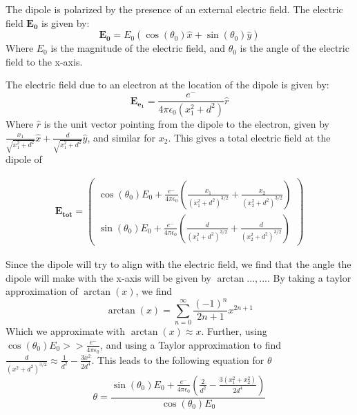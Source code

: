 The dipole is polarized by the presence of an external electric field. The electric field $\mathbf{E_0}$ is given by:
\begin{equation}
    \mathbf{E_0} = 
    E_0 (\cos(\theta_0) \hat{x} + \sin(\theta_0) \hat{y})
\end{equation}
Where $E_0$ is the magnitude of the electric field, and $\theta_0$ is the angle of the electric field to the x-axis. 

The electric field due to an electron at the location of the dipole is given by:
\begin{equation}
    \mathbf{E_{\text{e}_1}} = 
    \frac{e^-}{4 \pi \epsilon_0 (x_1^2+d^2)} \hat{r} 
\end{equation}
Where $\hat{r}$ is the unit vector pointing from the dipole to the electron, given by $\frac{x_1}{\sqrt{x_1^2+d^2}} \hat{x} + \frac{d}{\sqrt{x_1^2 + d^2}} \hat{y}$, and similar for $x_2$. This gives a total electric field at the dipole of 

\begin{align}
    \mathbf{E_{tot}} = 
    \begin{pmatrix}
        \cos(\theta_0) E_0 + \frac{e^-}{4 \pi \epsilon_0} 
        \left( \frac{x_1}{(x_1^2+d^2)^{3/2}} + \frac{x_2}{(x_2^2+d^2)^{3/2}} \right)  \\
        \sin(\theta_0) E_0 + \frac{e^-}{4 \pi \epsilon_0} 
        \left( \frac{d}{(x_1^2+d^2)^{3/2}} + \frac{d}{(x_2^2 + d^2) ^{3/2}} \right) 
    \end{pmatrix}
\end{align}

Since the dipole will try to align with the electric field, we find that the angle the dipole will make with the x-axis will be given by $\arctan{..., ...}$. By taking a taylor approximation of $\arctan(x)$, we find
\begin{equation}
    \arctan(x) = \sum_{n=0}^{\infty} \frac{(-1)^n}{2n+1}x^{2n+1}
\end{equation}
Which we approximate with $\arctan(x) \approx x$. 
Further, using $\cos(\theta_0) E_0 >> \frac{e^-}{4 \pi \epsilon_0}$, and using a Taylor approximation to find $\frac{d}{(x^2+d^2)^{3/2}} \approx \frac{1}{d^2} - \frac{3x^2}{2d^4}$. This leads to the following equation for $\theta$ 
\begin{equation}
    \theta = 
    \frac{\sin(\theta_0)E_0 + \frac{e^-}{4 \pi \epsilon_0}
    \left(\frac{2}{d^2}-\frac{3(x_1^2+x_2^2) }{2d^4}\right)}{\cos(\theta_0) E_0}
\end{equation}

